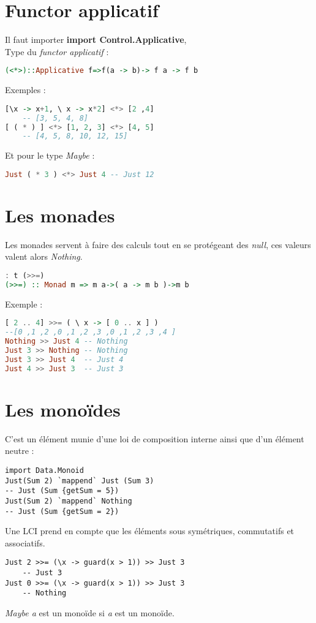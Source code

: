     \section{Functor applicatif}
        Il faut importer \textbf{import Control.Applicative},\\
        Type du \textit{functor applicatif} :
        \begin{lstlisting}[language=Haskell]
(<*>)::Applicative f=>f(a -> b)-> f a -> f b 
        \end{lstlisting}
        Exemples :
        \begin{lstlisting}[language=Haskell]
[\x -> x+1, \ x -> x*2] <*> [2 ,4]
    -- [3, 5, 4, 8]
[ ( * ) ] <*> [1, 2, 3] <*> [4, 5]
    -- [4, 5, 8, 10, 12, 15]
        \end{lstlisting}
        Et pour le type \textit{Maybe} :
        \begin{lstlisting}[language=Haskell]
Just ( * 3 ) <*> Just 4 -- Just 12
        \end{lstlisting}
    \section{Les monades}
        Les monades servent à faire des calculs tout en se protégeant des \textit{null}, ces valeurs valent alors \textit{Nothing}.
        \begin{lstlisting}[language=Haskell]
: t (>>=)
(>>=) :: Monad m => m a->( a -> m b )->m b
        \end{lstlisting}
        Exemple :
        \begin{lstlisting}[language=Haskell]
[ 2 .. 4] >>= ( \ x -> [ 0 .. x ] )
--[0 ,1 ,2 ,0 ,1 ,2 ,3 ,0 ,1 ,2 ,3 ,4 ]
Nothing >> Just 4 -- Nothing
Just 3 >> Nothing -- Nothing
Just 3 >> Just 4  -- Just 4
Just 4 >> Just 3  -- Just 3
        \end{lstlisting}
    \section{Les monoïdes}
        C'est un élément munie d'une loi de composition interne ainsi que d'un élément neutre :
        \begin{lstlisting}
import Data.Monoid
Just(Sum 2) `mappend` Just (Sum 3)
-- Just (Sum {getSum = 5})
Just(Sum 2) `mappend` Nothing
-- Just (Sum {getSum = 2})
        \end{lstlisting}
        Une LCI prend en compte que les éléments sous symétriques, commutatifs et associatifs.
        \begin{lstlisting}
Just 2 >>= (\x -> guard(x > 1)) >> Just 3
	-- Just 3
Just 0 >>= (\x -> guard(x > 1)) >> Just 3
	-- Nothing
        \end{lstlisting}
        \textit{Maybe a} est un monoïde si \textit{a} est un monoïde.




